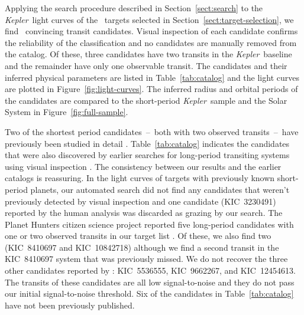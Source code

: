 \documentclass[manuscript, letterpaper]{aastex6}
\makeatletter
\let\origsection\section
\renewcommand\section{\@ifstar{\starsection}{\nostarsection}}
\newcommand\nostarsection[1]{\sectionprelude\origsection{#1}}
\newcommand\starsection[1]{\sectionprelude\origsection*{#1}}
\newcommand\sectionprelude{\vspace{1em}}
\newcommand{\project}[1]{\textsl{#1}}
\newcommand{\kepler}{\project{Kepler}}
\newcommand{\dfmfigref}[1]{\ref{fig:#1}}
\newcommand{\dfmFig}[1]{Figure~\dfmfigref{#1}}
\newcommand{\dfmfig}[1]{\dfmFig{#1}}
\newcommand{\sectionname}{Section}
\newcommand{\sectref}[1]{\ref{sect:#1}}
\newcommand{\Sect}[1]{\sectionname~\sectref{#1}}
\newcommand{\sect}[1]{\Sect{#1}}
\newcommand{\sectlabel}[1]{\label{sect:#1}}
\makeatother
\begin{document}
\section{Catalog of transit candidates}\sectlabel{catalog}

Applying the search procedure described in \sect{search} to the \kepler\ light
curves of the \numtargets\ targets selected in \sect{target-selection}, we
find \numcands\ convincing transit candidates.
Visual inspection of each candidate confirms the reliability of the
classification and no candidates are manually removed from the catalog.
Of these, three candidates have two transits in the \kepler\ baseline and the
remainder have only one observable transit.
The candidates and their inferred physical parameters are listed in
Table~\ref{tab:catalog} and the light curves are plotted in
\dfmfig{light-curves}.
The inferred radius and orbital periods of the candidates are compared to the
short-period \kepler\ sample and the Solar System in \dfmfig{full-sample}.

Two of the shortest period candidates~--~both with two observed
transits~--~have previously been studied in detail \citep[KIC~8800954 and
KIC~3239945;][]{Kipping:2014a, Kipping:2016}.
Table~\ref{tab:catalog} indicates the candidates that were also discovered by
earlier searches for long-period transiting systems using visual inspection
\citep{Wang:2015, Uehara:2016}.
The consistency between our results and the earlier catalogs is reassuring.
In the light curves of targets with previously known short-period planets, our
automated search did not find any candidates that weren't previously detected
by visual inspection \citep{Uehara:2016} and one candidate (KIC~3230491)
reported by the human analysis was discarded as grazing by our search.
The Planet Hunters citizen science project \citep{Fischer:2012} reported five
long-period candidates with one or two observed transits in our target list
\citep{Wang:2015}.
Of these, we also find two (KIC~8410697 and KIC~10842718) although we find a
second transit in the KIC~8410697 system that was previously missed.
We do not recover the three other candidates reported by \citet{Wang:2015}:
KIC~5536555, KIC~9662267, and KIC~12454613.
The transits of these candidates are all low signal-to-noise and they do not
pass our initial signal-to-noise threshold.
Six of the candidates in Table~\ref{tab:catalog} have not been previously
published.
\end{document}
